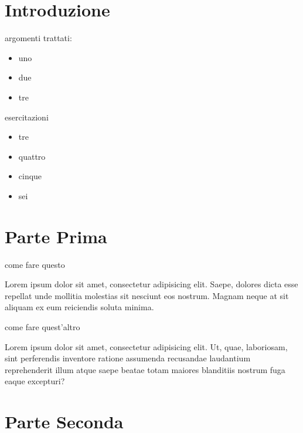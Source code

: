 \section{Introduzione}\label{introduzione}

\begin{frame}{argomenti trattati:}

\begin{itemize}[<+->]
\itemsep1pt\parskip0pt
\item
  uno
\item
  due
\item
  tre
\end{itemize}

\end{frame}

\begin{frame}{esercitazioni}

\begin{itemize}[<+->]
\itemsep1pt\parskip0pt
\item
  tre
\item
  quattro
\item
  cinque
\item
  sei
\end{itemize}

\end{frame}

\section{Parte Prima}\label{parte-prima}

\begin{frame}{come fare questo}

Lorem ipsum dolor sit amet, consectetur adipisicing elit. Saepe, dolores
dicta esse repellat unde mollitia molestias sit nesciunt eos nostrum.
Magnam neque at sit aliquam ex eum reiciendis soluta minima.

\end{frame}

\begin{frame}{come fare quest'altro}

Lorem ipsum dolor sit amet, consectetur adipisicing elit. Ut, quae,
laboriosam, sint perferendis inventore ratione assumenda recusandae
laudantium reprehenderit illum atque saepe beatae totam maiores
blanditiis nostrum fuga eaque excepturi?

\end{frame}

\section{Parte Seconda}\label{parte-seconda}

